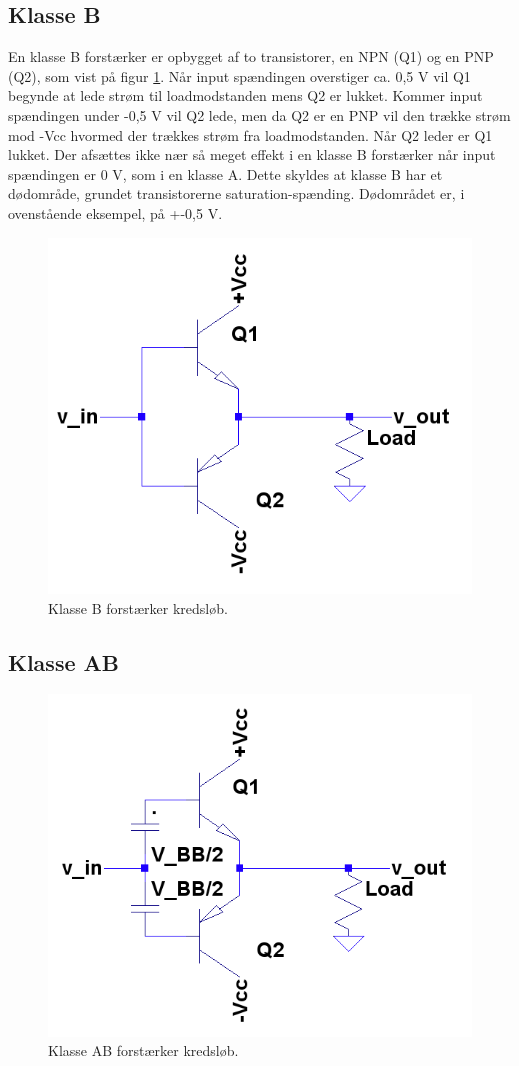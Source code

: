 \subsection{Klasse B}
En klasse B forstærker er opbygget af to transistorer, en NPN (Q1) og en PNP (Q2), som vist på figur \ref{fig:classb}. Når input spændingen overstiger ca. 0,5 V vil Q1 begynde at lede strøm til loadmodstanden mens Q2 er lukket. Kommer input spændingen under -0,5 V vil Q2 lede, men da Q2 er en PNP vil den trække strøm mod -Vcc hvormed der trækkes strøm fra loadmodstanden. Når Q2 leder er Q1 lukket. 
Der afsættes ikke nær så meget effekt i en klasse B forstærker når input spændingen er 0 V, som i en klasse A. Dette skyldes at klasse B har et dødområde, grundet transistorerne saturation-spænding. Dødområdet er, i ovenstående eksempel, på +-0,5 V. 

\begin{figure}[h]
\centering
\includegraphics[scale=.6]{klasser/classb.png}
\caption{Klasse B forstærker kredsløb.}
\label{fig:classb}
\end{figure}

\subsection{Klasse AB}
\begin{figure}[h]
\centering
\includegraphics[scale=.6]{klasser/classab.png}
\caption{Klasse AB forstærker kredsløb.}
\label{fig:classab}
\end{figure}